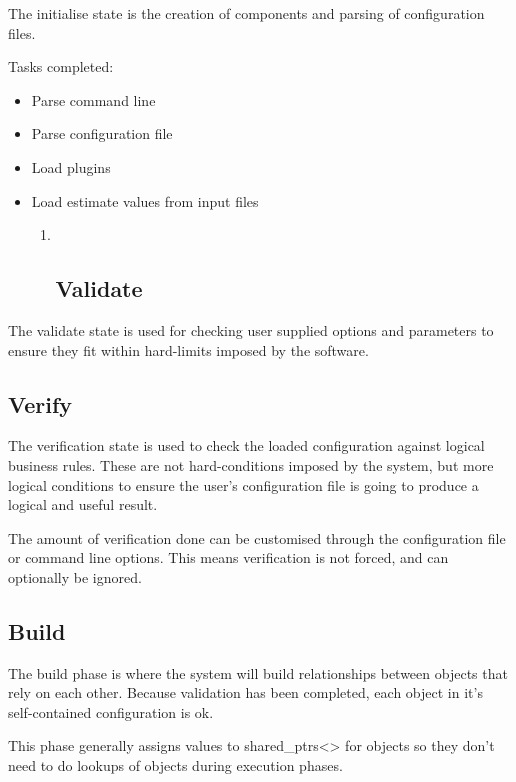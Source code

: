 \documentclass[a4paper,11pt,twoside,pdftex,draft]{article}
\begin{document}
The initialise state is the creation of components and parsing of
configuration files.

Tasks completed:

\begin{itemize}
\item
  Parse command line
\item
  Parse configuration file
\item
  Load plugins
\item
  Load estimate values from input files

  \begin{enumerate}
  \item ~
    \hypertarget{validate}{%
    \subsection{Validate}\label{validate}}
  \end{enumerate}
\end{itemize}

The validate state is used for checking user supplied options and
parameters to ensure they fit within hard-limits imposed by the
software.

\hypertarget{verify}{%
\subsection{Verify}\label{verify}}

The verification state is used to check the loaded configuration against
logical business rules. These are not hard-conditions imposed by the
system, but more logical conditions to ensure the user's configuration
file is going to produce a logical and useful result.

The amount of verification done can be customised through the
configuration file or command line options. This means verification is
not forced, and can optionally be ignored.

\hypertarget{build}{%
\subsection{Build}\label{build}}

The build phase is where the system will build relationships between
objects that rely on each other. Because validation has been completed,
each object in it's self-contained configuration is ok.

This phase generally assigns values to
shared\_ptrs\textless\textgreater{} for objects so they don't need to do
lookups of objects during execution phases.
\end{document}
